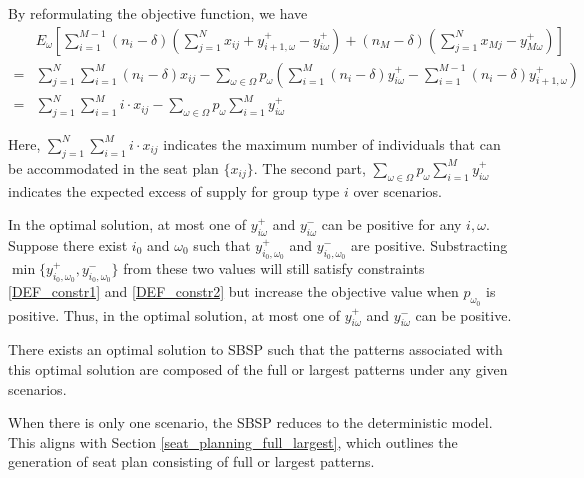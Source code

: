 By reformulating the objective function, we have
\begin{align*}
  & E_{\omega}\left[\sum_{i=1}^{M-1} (n_i-\delta) (\sum_{j= 1}^{N} x_{ij} + y_{i+1,\omega}^{+} - y_{i \omega}^{+}) + (n_M-\delta) (\sum_{j= 1}^{N} x_{Mj} - y_{M \omega}^{+})\right] \\
  = & \sum_{j =1}^{N} \sum_{i=1}^M (n_i- \delta) x_{ij} - \sum_{\omega \in \Omega} p_{\omega} \left(\sum_{i=1}^{M}(n_i- \delta)y_{i \omega}^{+} - \sum_{i=1}^{M-1}(n_i-\delta)y_{i+1, \omega}^{+}\right) \\
  = & \sum_{j =1}^{N} \sum_{i=1}^M i \cdot x_{ij} - \sum_{\omega \in \Omega} p_{\omega} \sum_{i = 1}^{M} y_{i \omega}^{+}
\end{align*}

Here, $\sum_{j =1}^{N} \sum_{i=1}^M i \cdot x_{ij}$ indicates the maximum number of individuals that can be accommodated in the seat plan $\{x_{ij}\}$. The second part, $\sum_{\omega \in \Omega} p_{\omega} \sum_{i = 1}^{M} y_{i \omega}^{+}$ indicates the expected excess of supply for group type $i$ over scenarios.

In the optimal solution, at most one of $y_{i \omega}^{+}$ and $y_{i \omega}^{-}$ can be positive for any $i, \omega$. Suppose there exist $i_0$ and $\omega_0$ such that $y_{i_0, \omega_0}^{+}$ and $y_{i_0, \omega_0}^{-}$ are positive. Substracting $\min\{y_{i_0, \omega_0}^{+}, y_{i_0, \omega_0}^{-}\}$ from these two values will still satisfy constraints \eqref{DEF_constr1} and \eqref{DEF_constr2} but increase the objective value when $p_{\omega_0}$ is positive. Thus, in the optimal solution, at most one of $y_{i \omega}^{+}$ and $y_{i \omega}^{-}$ can be positive.


\begin{prop}\label{prop_solution}
There exists an optimal solution to SBSP such that the patterns associated with this optimal solution are composed of the full or largest patterns under any given scenarios.
\end{prop}

When there is only one scenario, the SBSP reduces to the deterministic model. This aligns with Section \ref{seat_planning_full_largest}, which outlines the generation of seat plan consisting of full or largest patterns.

